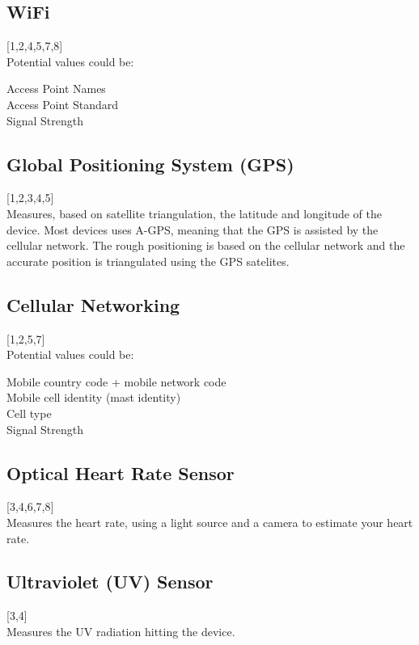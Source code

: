 \subsection{WiFi}
\label{sub:wifi}
[1,2,4,5,7,8] \\
Potential values could be: 

Access Point Names \\
Access Point Standard \\
Signal Strength

\subsection{Global Positioning System (GPS)}
\label{sub:gps}
[1,2,3,4,5] \\
Measures, based on satellite triangulation,  the latitude and longitude of the device. Most devices uses A-GPS, meaning that the GPS is assisted by the cellular network. The rough positioning is based on the cellular network and the accurate position is triangulated using the GPS satelites.

\subsection{Cellular Networking}
\label{sub:cellular_networking}
[1,2,5,7] \\
Potential values could be: 

Mobile country code + mobile network code \\
Mobile cell identity (mast identity) \\
Cell type  \\
Signal Strength \\


\subsection{Optical Heart Rate Sensor}
\label{sub:optical_heart_rate_sensor}
[3,4,6,7,8] \\
Measures the heart rate, using a light source and a camera to estimate your heart rate.

\subsection{Ultraviolet (UV) Sensor}
\label{sub:uv_sensor}
[3,4] \\
Measures the UV radiation hitting the device.

